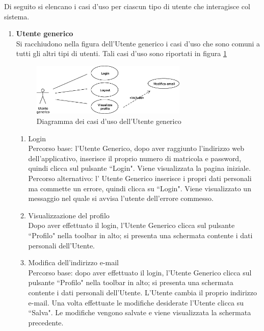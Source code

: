 Di seguito si elencano i casi d'uso per ciascun tipo di utente che interagisce col sistema. 
\begin{enumerate}

\item \textbf{Utente generico}\\
Si racchiudono nella figura dell'Utente generico i casi d'uso che sono comuni a tutti gli altri tipi di utenti. Tali casi d'uso sono riportati in figura \ref{use_case_diag_generic}

\begin{figure}[h]
  \caption{Diagramma dei casi d'uso dell'Utente generico}
  \label{use_case_diag_generic}
  \centering
    \includegraphics[width=0.7\textwidth]{images/casi_uso_utente_generico.eps}
\end{figure}

\begin{enumerate}

 \item Login\\ \label{UC_login}
    Percorso base:
    l'Utente Generico, dopo aver raggiunto l'indirizzo web dell'applicativo, inserisce il proprio numero di matricola e password, quindi clicca sul pulsante ``Login". Viene visualizzata la pagina iniziale.\\
    Percorso alternativo:
    l' Utente Generico inserisce i propri dati personali ma commette un errore, quindi clicca su ``Login". Viene visualizzato un messaggio nel quale si avvisa l'utente dell'errore commesso.
    
 \item Visualizzazione del profilo\\ \label{UC_view_profile}
    Dopo aver effettuato il login, l'Utente Generico clicca sul pulsante ``Profilo" nella toolbar in alto; si presenta una schermata contente i dati personali dell'Utente.
 \item Modifica dell'indirizzo e-mail\\ \label{UC_edit_email}
  Percorso base:
  dopo aver effettuato il login, l'Utente Generico clicca sul pulsante ``Profilo" nella toolbar in alto; si presenta una schermata contente i dati personali dell'Utente.
  L'Utente cambia il proprio indirizzo e-mail. Una volta effettuate le modifiche desiderate l'Utente clicca su ``Salva". Le modifiche vengono salvate e viene visualizzata la schermata precedente.\\
  

\end{enumerate}
\end{enumerate}
